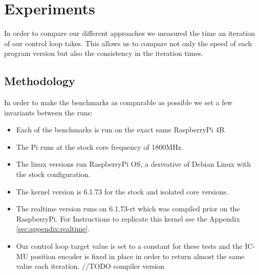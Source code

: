 \chapter{Experiments}
\label{chap:experiments}

In order to compare our different approaches we measured the time an iteration of our control loop takes.
This allows us to compare not only the speed of each program version but also the consistency in the iteration times.

\section{Methodology}
\label{sec:experiments:methodology}

In order to make the benchmarks as comparable as possible we set a few invariants between the runs:
\begin{itemize}
    \item Each of the benchmarks is run on the exact same RaspberryPi 4B.
    \item The Pi runs at the stock core frequency of 1800MHz.
    \item The linux versions run RaspberryPi OS, a derivative of Debian Linux with the stock configuration.
    \item The kernel version is 6.1.73 for the stock and isolated core versions.
    \item The realtime version runs on 6.1.73-rt which was compiled prior on the RaspberryPi. For Instructions to replicate this kernel see the Appendix \ref{sec:appendix:realtime}.
    \item Our control loop target value is set to a constant for these tests and the IC-MU position encoder is fixed in place in order to return almost the same value each iteration.
    //TODO compiler version
\end{itemize}


